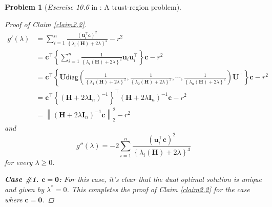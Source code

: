 \documentclass[11pt]{article}
\newtheorem{problem}{Problem}
\numberwithin{equation}{problem}
\begin{document}
\begin{problem} [\emph{Exercise 10.6} in \cite{calafiore2014optimization}: A trust-region problem]
{\begin{proof} [Proof of Claim \ref{claim2.2}]
\begin{equation}
\begin{split}
        g' (\lambda) &=
        \sum_{i=1}^{n} \frac{\left( \mathbf{u}_{i}^{\top} \mathbf{c} \right)^2}{\left\{ \lambda_i (\mathbf{H}) + 2 \lambda \right\}^2} - r^2 \\
        &= \mathbf{c}^{\top} \left\{ \sum_{i=1}^{n} \frac{1}{\left\{ \lambda_i (\mathbf{H}) + 2 \lambda \right\}^2} \mathbf{u}_i \mathbf{u}_{i}^{\top} \right\} \mathbf{c} - r^2 \\
        &= \mathbf{c}^{\top} \left\{ \mathbf{U} \textsf{diag} \left( \frac{1}{\left\{ \lambda_1 (\mathbf{H}) + 2 \lambda \right\}^2}, \frac{1}{\left\{ \lambda_2 (\mathbf{H}) + 2 \lambda \right\}^2}, \cdots, \frac{1}{\left\{ \lambda_n (\mathbf{H}) + 2 \lambda \right\}^2} \right) \mathbf{U}^{\top} \right\} \mathbf{c} - r^2 \\
        &= \mathbf{c}^{\top} \left\{ \left( \mathbf{H} + 2 \lambda \mathbf{I}_n \right)^{-1} \right\}^{\top} \left( \mathbf{H} + 2 \lambda \mathbf{I}_n \right)^{-1} \mathbf{c} - r^2 \\
        &= \left\| \left( \mathbf{H} + 2 \lambda \mathbf{I}_n \right)^{-1} \mathbf{c} \right\|_{2}^2 - r^2
    \end{split}
\end{equation}
and
\begin{equation*}
    g''(\lambda) = - 2 \sum_{i=1}^{n} \frac{\left( \mathbf{u}_{i}^{\top} \mathbf{c} \right)^2}{\left\{ \lambda_i (\mathbf{H}) + 2 \lambda \right\}^3}
\end{equation*}
for every $\lambda \geq 0$.
\medskip

\indent \textbf{Case \#1. $\mathbf{c} = \mathbf{0}$:} For this case, it's clear that the dual optimal solution is unique and given by $\lambda^* = 0$. This completes the proof of Claim \ref{claim2.2} for the case where $\mathbf{c} = \mathbf{0}$.
\medskip


\end{proof}}
\end{problem}
\end{document}
